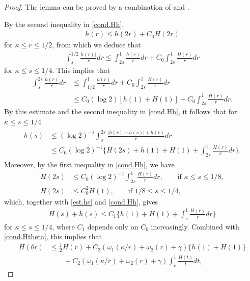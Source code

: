 \documentclass[reqno,12pt]{amsart} %
\theoremstyle{definition}
\theoremstyle{remark}
\numberwithin{equation}{section}
\begin{document}
\begin{proof}
The lemma can be proved by a combination of \cite[Lemma 6.2]{Niu25_Optimal} and \cite[Lemma 6.7]{Gu22_incompressible}.

By the second inequality in \eqref{cond.Hh},
\begin{align*}
  h(r)\leq h(2r)+C_0H(2r)
\end{align*}
for $\kappa\leq r\leq 1/2$, from which we deduce that
\begin{align*}
  \int_s^{1/2}\frac{h(r))}{r}dr\leq \int_{2s}^1\frac{h(r)}{r}dr+C_0\int_{2s}^1\frac{H(r)}{r}dr
\end{align*}
for $\kappa\leq s\leq 1/4$. This implies that
\begin{align*}
  \int_{s}^{2s}\frac{h(r)}{r}dr&\leq \int_{1/2}^1\frac{h(r)}{r}dr+C_0\int_{2s}^1\frac{H(r)}{r}dr\\&\leq C_0(\log 2)[h(1)+H(1)]+C_0\int_{2s}^1\frac{H(r)}{r}dr. 
\end{align*}
By this estimate and the second inequality in \eqref{cond.Hh}, it follows that for $\kappa\leq s\leq 1/4$
\begin{align}\label{est.hs}
    \begin{aligned}
    h(s)&\leq (\log 2)^{-1}\int_s^{2s}\frac{|h(r)-h(s)|+h(r)}{r}dr\\&\leq C_0(\log 2)^{-1}\Big\{H(2s)+h(1)+H(1)+\int_{2s}^1\frac{H(r)}{r}dr\Big\}. 
    \end{aligned}
\end{align}
Moreover, by the first inequality in \eqref{cond.Hh}, we have
\begin{align*}
  H(2s)&\leq C_0(\log 2)^{-1}\int_{2s}^1\frac{H(r)}{r}dr,\qquad \text{if }\kappa\leq s\leq 1/8,\\
  H(2s)&\leq C_0^2H(1), \qquad \text{if }1/8\leq s\leq 1/4,
\end{align*}
which, together with \eqref{est.hs} and \eqref{cond.Hh}, gives
\begin{align}\label{est.Hshs}
  H(s)+h(s)\leq C_1\bigg\{h(1)+H(1)+\int_s^1\frac{H(r)}{r}dr\bigg\}
\end{align}
for $\kappa\leq s\leq 1/4$, where $C_1$ depends only on $C_0$ increasingly. Combined with \eqref{cond.Htheta}, this implies that
\begin{align*}
H(\theta r)&\leq \frac{1}{2}H(r)+C_2(\omega_1(\kappa/r)+\omega_2(r)+\gamma)\{h(1)+H(1)\}\\&\qquad+C_2(\omega_1(\kappa/r)+\omega_2(r)+\gamma)\int_r^1\frac{H(t)}{t}dt,
\end{align*}

\end{proof}
\end{document}
